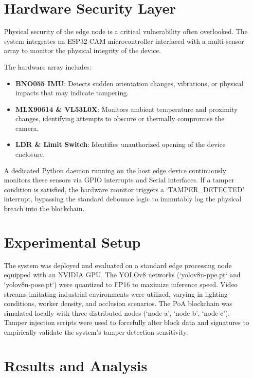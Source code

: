 \documentclass[conference]{IEEEtran}
\begin{document}
\section{Hardware Security Layer}

Physical security of the edge node is a critical vulnerability often overlooked. The system integrates an ESP32-CAM microcontroller interfaced with a multi-sensor array to monitor the physical integrity of the device.

The hardware array includes:
\begin{itemize}
    \item \textbf{BNO055 IMU}: Detects sudden orientation changes, vibrations, or physical impacts that may indicate tampering.
    \item \textbf{MLX90614 \& VL53L0X}: Monitors ambient temperature and proximity changes, identifying attempts to obscure or thermally compromise the camera.
    \item \textbf{LDR \& Limit Switch}: Identifies unauthorized opening of the device enclosure.
\end{itemize}

A dedicated Python daemon running on the host edge device continuously monitors these sensors via GPIO interrupts and Serial interfaces. If a tamper condition is satisfied, the hardware monitor triggers a `TAMPER\_DETECTED' interrupt, bypassing the standard debounce logic to immutably log the physical breach into the blockchain.

\section{Experimental Setup}

The system was deployed and evaluated on a standard edge processing node equipped with an NVIDIA GPU. The YOLOv8 networks (`yolov8n-ppe.pt` and `yolov8n-pose.pt`) were quantized to FP16 to maximize inference speed. Video streams imitating industrial environments were utilized, varying in lighting conditions, worker density, and occlusion scenarios.
The PoA blockchain was simulated locally with three distributed nodes (`node-a', `node-b', `node-c'). Tamper injection scripts were used to forcefully alter block data and signatures to empirically validate the system's tamper-detection sensitivity.

\section{Results and Analysis}
\end{document}
